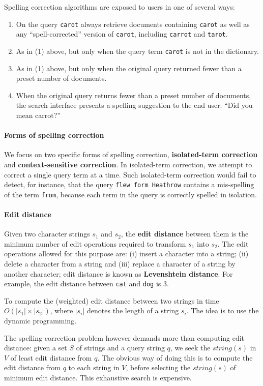 \documentclass[letterpaper,11pt]{article}
\newcommand{\code}[1]{\texttt{#1}}
\begin{document}
Spelling correction algorithms are exposed to users in one of several ways:
\begin{enumerate}
    \item On the query \code{carot} always retrieve documents containing \code{carot} as well as any “spell-corrected” version of \code{carot}, including \code{carrot} and \code{tarot}.
    \item As in (1) above, but only when the query term \code{carot} is not in the dictionary.
    \item As in (1) above, but only when the original query returned fewer than a preset number of documents.
    \item When the original query returns fewer than a preset number of documents, the search interface presents a spelling suggestion to the end user: “Did you mean carrot?”
\end{enumerate}

\paragraph{Forms of spelling correction}
We focus on two specific forms of spelling correction, \textbf{isolated-term correction} and \textbf{context-sensitive correction}. In isolated-term correction, we attempt to correct a single query term at a time. Such isolated-term correction would fail to detect, for instance, that the query \code{flew form Heathrow} contains a mis-spelling of the term \code{from}, because each term in the query is correctly spelled in isolation.

\paragraph{Edit distance}
Given two character strings $s_1$ and $s_2$, the \textbf{edit distance} between them is the minimum number of edit operations required to transform $s_1$ into $s_2$. The edit operations allowed for this purpose are: (i) insert a character into a string; (ii) delete a character from a string and (iii) replace a character of a string by another character; edit distance is known as \textbf{Levenshtein distance}. For example, the edit distance between \code{cat} and \code{dog} is 3.

To compute the (weighted) edit distance between two strings in time $O(|s_1|\times|s_2|)$, where $|s_i|$ denotes the length of a string $s_i$. The idea is to use the dynamic programming.

The spelling correction problem however demands more than computing edit distance: given a set $S$ of strings and a query string $q$, we seek the $string(s)$ in $V$ of least edit distance from $q$. The obvious way of doing this is to compute the edit distance from $q$ to each string in $V$, before selecting the $string(s)$ of minimum edit distance. This exhaustive search is expensive.
\end{document}
